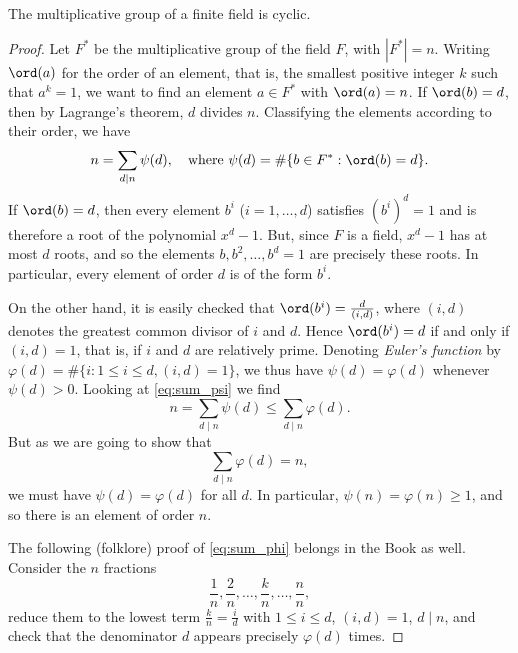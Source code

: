 \begin{theorem}
  \label{mult_cyclic}
  \leanok
  The multiplicative group of a finite field is cyclic.
\end{theorem}
\begin{proof}
  Let $F^*$ be the multiplicative group of the field $F$, with $|F^*| = n$. Writing $\ord(a)$ for the order of an element, that is, the smallest positive integer $k$ such that $a^k = 1$, we want to find an element $a \in F^*$ with $\ord(a) = n$. If $\ord(b) = d$, then by Lagrange's theorem, $d$ divides $n$. Classifying the elements according to their order, we have
  \begin{equation} \label{eq:sum_psi}
  n = \sum_{d \mid n} \psi(d), \quad \text{where } \psi(d) = \#\{b\in F^*: \ord(b) = d\}.
  \end{equation}
  If $\ord(b) = d$, then every element $b^i$ ($i = 1, \dots, d$) satisfies $(b^i)^d = 1$ and is therefore a root of the polynomial $x^d - 1$. But, since $F$ is a field, $x^d - 1$ has at most $d$ roots, and so the elements $b, b^2, \dots, b^d = 1$ are precisely these roots. In particular, every element of order $d$ is of the form $b^i$.
  
  On the other hand, it is easily checked that $\ord(b^i) = \frac{d}{(i, d)}$, where $(i, d)$ denotes the greatest common divisor of $i$ and $d$. Hence $\ord(b^i) = d$ if and only if $(i, d) = 1$, that is, if $i$ and $d$ are relatively prime. Denoting \textit{Euler's function} by $\varphi(d) = \#\{i : 1 \le i \le d, (i, d) = 1\}$, we thus have $\psi(d) = \varphi(d)$ whenever $\psi(d) > 0$. Looking at \eqref{eq:sum_psi} we find
  \[
  n = \sum_{d \mid n} \psi(d) \le \sum_{d \mid n} \varphi(d).
  \]
  But as we are going to show that
  \begin{equation} \label{eq:sum_phi}
  \sum_{d \mid n} \varphi(d) = n,
  \end{equation}
  we must have $\psi(d) = \varphi(d)$ for all $d$. In particular, $\psi(n) = \varphi(n) \ge 1$, and so there is an element of order $n$.
  
  The following (folklore) proof of \eqref{eq:sum_phi} belongs in the Book as well. Consider the $n$ fractions
  \[
  \frac{1}{n}, \frac{2}{n}, \dots, \frac{k}{n}, \dots, \frac{n}{n},
  \]
  reduce them to the lowest term $\frac{k}{n} = \frac{i}{d}$ with $1 \le i \le d$, $(i, d) = 1$, $d \mid n$, and check that the denominator $d$ appears precisely $\varphi(d)$ times.
\end{proof}


